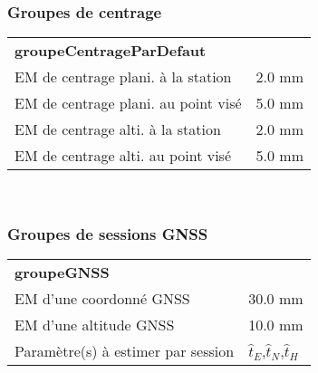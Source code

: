 \documentclass[a4paper, 9pt]{report}
\newcommand{\edithrulefill}{
        \vspace*{-6pt}
        \hrulefill
    }
\begin{document}
                    \subsubsection{Groupes de centrage}
                    \edithrulefill
                    \vspace*{6pt}
                    
                                    \begin{tabular}{p{6cm} p{3.5cm}}
                                         \textbf{groupeCentrageParDefaut} &    \\
                                         EM de centrage plani. à la station  & 2.0 mm \\
                                         EM de centrage plani. au point visé  & 5.0 mm \\
                                         EM de centrage alti. à la station  & 2.0 mm \\
                                         EM de centrage alti. au point visé  & 5.0 mm \\
                                     \end{tabular}
                                     \vspace*{8pt}\\
                    \subsubsection{Groupes de sessions GNSS}
                    \edithrulefill
                    \vspace*{6pt}
                    
                    \begin{tabular}{p{6cm} p{3.5cm}}
                                \textbf{groupeGNSS} & \\
                                EM d'une coordonné GNSS  & 30.0 mm \\
                                EM d'une altitude GNSS & 10.0 mm \\
                                Paramètre(s) à estimer par session & $\hat{t}_E$,$\hat{t}_N$,$\hat{t}_H$ \\
                            \end{tabular}
                            \vspace*{8pt}\\
                    
\end{document}
